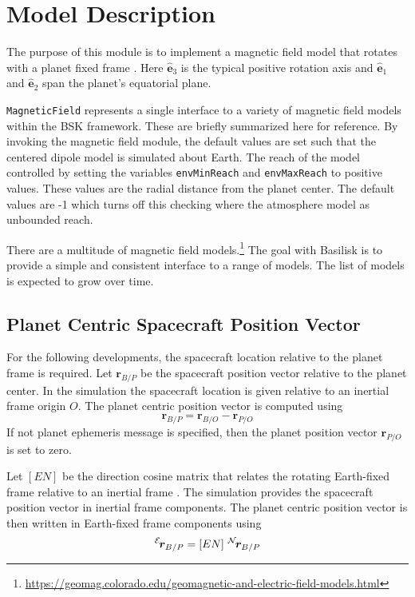 
\section{Model Description}
The purpose of this module is to implement a magnetic field model that rotates with a planet fixed frame .  Here $\hat{\bm e}_{3}$ is the typical positive rotation axis and $\hat{\bm e}_{1}$ and $\hat{\bm e}_{2}$ span the planet's equatorial plane. 

{\tt MagneticField} represents a single interface to a variety of magnetic field models within the BSK framework. These are briefly summarized here for reference.
By invoking the magnetic field module, the default values are set such that the centered dipole model is simulated about Earth.
The reach of the model controlled by setting the variables {\tt envMinReach} and {\tt envMaxReach} to positive values.  These values are the radial distance from the planet center.  The default values are -1 which turns off this checking where the atmosphere model as unbounded reach.  

There are a multitude of magnetic field models.\footnote{\url { https://geomag.colorado.edu/geomagnetic-and-electric-field-models.html}} The goal with Basilisk is to provide a simple and consistent interface to a range of models.  The list of models is expected to grow over time.


\subsection{Planet Centric Spacecraft Position Vector}

For the following developments, the spacecraft location relative to the planet frame is required.  Let $\bm r_{B/P}$ be the spacecraft position vector relative to the planet center.  In the simulation the spacecraft location is given relative to an inertial frame origin $O$.  The planet centric position vector is computed using
\begin{equation}
	\bm r_{B/P} = \bm r_{B/O} - \bm r_{P/O}
\end{equation}
If not planet ephemeris message is specified, then the planet position vector $\bm r_{P/O}$ is set to zero.  

Let $[EN]$ be the direction cosine matrix\cite{schaub} that relates the rotating Earth-fixed frame relative to an inertial frame .  The simulation provides the spacecraft position vector in inertial frame components.  The planet centric position vector is then written in Earth-fixed frame components using
\begin{equation}
	\leftexp{E}{\bm r}_{B/P} = [EN] \ \leftexp{N}{\bm r}_{B/P}
\end{equation}




